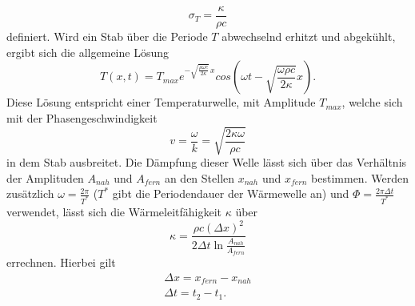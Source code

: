 \begin{equation}
    \sigma_{T} = \frac{\kappa}{\rho c}
\end{equation}
\noindent definiert. Wird ein Stab über die Periode $T$ abwechselnd erhitzt und abgekühlt, 
ergibt sich die allgemeine Lösung
\begin{equation}
    T(x,t) = T_{max} e^{-\sqrt{\frac{\rho \omega c}{2\kappa}}\,x} cos \left( \omega t - \sqrt{\frac{\omega \rho c}{2 \kappa}}x \right).
\end{equation}
\noindent Diese Lösung entspricht einer Temperaturwelle, mit Amplitude $T_{max}$, welche sich mit der Phasengeschwindigkeit
\begin{equation}
    v = \frac{\omega}{k} = \sqrt{ \frac{2 \kappa \omega}{\rho c} }
\end{equation}
\noindent in dem Stab ausbreitet. Die Dämpfung dieser Welle lässt sich über das Verhältnis der
Amplituden $A_{nah}$ und $A_{fern}$ an den Stellen $x_{nah}$ und $x_{fern}$ bestimmen. Werden zusätzlich
$\omega = \frac{2 \pi}{T^*}$ ($T^*$ gibt die Periodendauer der Wärmewelle an) und 
$\Phi = \frac{2 \pi \Delta t}{T^*}$ verwendet, lässt sich die Wärmeleitfähigkeit $\kappa$ 
über
\begin{equation}
    \kappa = \frac{\rho c (\Delta x)^2}{2 \Delta t \ln{\frac{A_{nah}}{A_{fern}}}}
    \label{eq:kappa}
\end{equation}
\noindent errechnen. Hierbei gilt 
\begin{align}
    \Delta x = x_{fern} - x_{nah} \nonumber \\
    \Delta t = t_2 - t_1 \nonumber.
\end{align}
